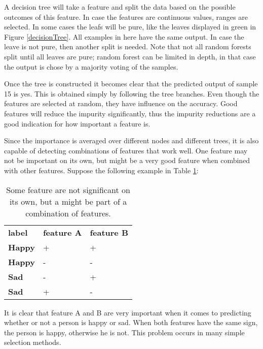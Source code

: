 \npar
A decision tree will take a feature and split the data based on the possible outcomes of this feature. In case the features are continuous values, ranges are selected. In some cases the leafs will be pure, like the leaves displayed in  green in Figure \ref{decisionTree}. All examples in here have the same output. In case the leave is not pure, then another split is needed. Note that not all random forests split until all leaves are pure; random forest can be limited in depth, in that case the output is chose by a majority voting of the samples.


Once the tree is constructed it becomes clear that the predicted output of sample 15 is yes. This is obtained simply by following the tree branches. Even though the features are selected at random, they have influence on the accuracy. Good features will reduce the impurity significantly, thus the impurity reductions are a good indication for how important a feature is.

\npar

Since the importance is averaged over different nodes and different trees, it is also capable of detecting combinations of features that work well. One feature may not be important on its own, but might be a very good feature when combined with other features. Suppose the following example in Table \ref{featPair}:

\begin{table}[H]
\centering
\label{featPair}
\begin{tabular}{lll}
\textbf{label} & \textbf{feature A} & \textbf{feature B} \\
\textbf{Happy} & +                  & +                  \\
\textbf{Happy} & -                  & -                  \\
\textbf{Sad}   & -                  & +                  \\
\textbf{Sad}   & +                  & -                 
\end{tabular}
\caption{Some feature are not significant on its own, but a might be part of a combination of features.}
\end{table}

It is clear that feature A and B are very important when it comes to predicting whether or not a person is happy or sad. When both features have the same sign, the person is happy, otherwise he is not. This problem occurs in many simple selection methods. 

